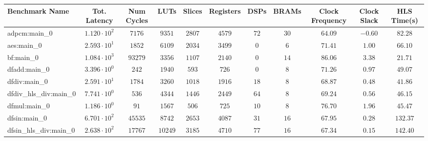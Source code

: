 \begin{tabular}{|l|c|c|c|c|c|c|c|c|c|c|}
\hline
Benchmark Name          & Tot. Latency           & Num Cycles & LUTs      & Slices    & Registers & DSPs    & BRAMs   & Clock Frequency & Clock Slack & HLS Time(s) \\
\hline
adpcm:main\_0           & $ 1.120 \cdot 10^{2} $ & $ 7176   $ & $ 9351  $ & $ 2807  $ & $ 4579  $ & $ 72  $ & $ 30  $ & $ 64.09       $ & $ -0.60   $ & $ 82.28   $ \\
aes:main\_0             & $ 2.593 \cdot 10^{1} $ & $ 1852   $ & $ 6109  $ & $ 2034  $ & $ 3499  $ & $ 0   $ & $ 6   $ & $ 71.41       $ & $ 1.00    $ & $ 66.10   $ \\
bf:main\_0              & $ 1.084 \cdot 10^{3} $ & $ 93279  $ & $ 3356  $ & $ 1107  $ & $ 2140  $ & $ 0   $ & $ 14  $ & $ 86.06       $ & $ 3.38    $ & $ 21.71   $ \\
dfadd:main\_0           & $ 3.396 \cdot 10^{0} $ & $ 242    $ & $ 1940  $ & $ 593   $ & $ 726   $ & $ 0   $ & $ 8   $ & $ 71.26       $ & $ 0.97    $ & $ 49.07   $ \\
dfdiv:main\_0           & $ 2.591 \cdot 10^{1} $ & $ 1784   $ & $ 3260  $ & $ 1018  $ & $ 1916  $ & $ 18  $ & $ 8   $ & $ 68.87       $ & $ 0.48    $ & $ 41.86   $ \\
dfdiv\_hls\_div:main\_0 & $ 7.741 \cdot 10^{0} $ & $ 536    $ & $ 4344  $ & $ 1446  $ & $ 2449  $ & $ 64  $ & $ 8   $ & $ 69.24       $ & $ 0.56    $ & $ 46.15   $ \\
dfmul:main\_0           & $ 1.186 \cdot 10^{0} $ & $ 91     $ & $ 1567  $ & $ 506   $ & $ 725   $ & $ 10  $ & $ 8   $ & $ 76.70       $ & $ 1.96    $ & $ 45.47   $ \\
dfsin:main\_0           & $ 6.701 \cdot 10^{2} $ & $ 45535  $ & $ 8742  $ & $ 2653  $ & $ 4087  $ & $ 31  $ & $ 16  $ & $ 67.95       $ & $ 0.28    $ & $ 132.37  $ \\
dfsin\_hls\_div:main\_0 & $ 2.638 \cdot 10^{2} $ & $ 17767  $ & $ 10249 $ & $ 3185  $ & $ 4710  $ & $ 77  $ & $ 16  $ & $ 67.34       $ & $ 0.15    $ & $ 142.40  $ \\

\end{tabular}
